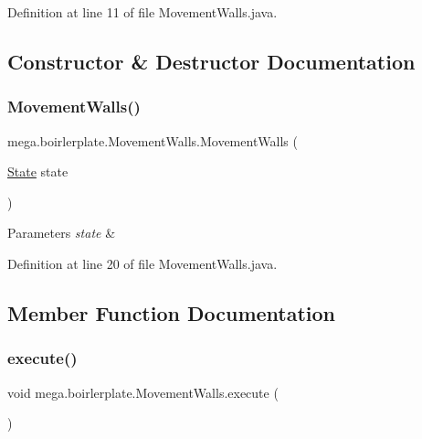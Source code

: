 Definition at line 11 of file Movement\+Walls.\+java.



\subsection{Constructor \& Destructor Documentation}
\mbox{\label{classmega_1_1boirlerplate_1_1_movement_walls_a5cae772481f48d33274bc7ac30a5597c}} 
\subsubsection{\texorpdfstring{Movement\+Walls()}{MovementWalls()}}
{\footnotesize\ttfamily mega.\+boirlerplate.\+Movement\+Walls.\+Movement\+Walls (\begin{DoxyParamCaption}\item[{\hyperlink{classmega_1_1boirlerplate_1_1_state}{State}}]{state }\end{DoxyParamCaption})}


\begin{DoxyParams}{Parameters}
{\em state} & \\
\hline
\end{DoxyParams}


Definition at line 20 of file Movement\+Walls.\+java.



\subsection{Member Function Documentation}
\mbox{\label{classmega_1_1boirlerplate_1_1_movement_walls_a286a113f200e75f76dd6e51010f0593c}} 
\subsubsection{\texorpdfstring{execute()}{execute()}}
{\footnotesize\ttfamily void mega.\+boirlerplate.\+Movement\+Walls.\+execute (\begin{DoxyParamCaption}{ }\end{DoxyParamCaption})}



